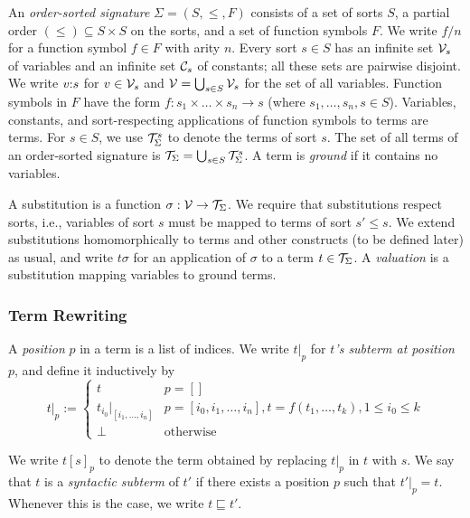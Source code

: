 An \emph{order-sorted signature} $\Sigma = (S, \leq, F)$ consists of a set of sorts $S$, a partial order $(\leq) \subseteq S \times S$ on the sorts, and a set of function symbols $F$.
We write $f/n$ for a function symbol $f \in F$ with arity $n$.
Every sort $s \in S$ has an infinite set $\mathcal{V}_s$ of variables and an infinite set $\mathcal{C}_s$ of constants; all these sets are pairwise disjoint.
We write $v{:}s$ for $v \in \mathcal{V}_s$ and $\mathcal{V} = \bigcup_{s \in S} \mathcal{V}_s$ for the set of all variables.
Function symbols in $F$ have the form $f: s_1 \times \dots \times s_n \rightarrow s$ (where $s_1, \dots, s_n, s \in S$).
Variables, constants, and sort-respecting applications of function symbols to terms are terms.
For $s \in S$, we use $\mathcal{T}_\Sigma^s$ to denote the terms of sort $s$.
The set of all terms of an order-sorted signature is $\mathcal{T}_\Sigma = \bigcup_{s \in S} \mathcal{T}_\Sigma^s$.
A term is \emph{ground} if it contains no variables.

A substitution is a function $\sigma: \mathcal{V} \to \mathcal{T}_\Sigma$.
We require that substitutions respect sorts, i.e., variables of sort $s$ must be mapped to terms of sort $s' \leq s$.
We extend substitutions homomorphically to terms and other constructs (to be defined later) as usual, and write $t\sigma$ for an application of $\sigma$ to a term $t \in \mathcal{T}_\Sigma$.
A \emph{valuation} is a substitution mapping variables to ground terms.

\subsubsection{Term Rewriting}

A \emph{position} $p$ in a term is a list of indices.
We write $t|_p$ for \emph{$t$'s subterm at position $p$}, and define it inductively by
\begin{equation*}
  t|_p := \begin{cases}
    t & p = [] \\
    t_{i_0}|_{[i_1, \dots, i_n]} & p = [i_0, i_1, \dots, i_n], t = f(t_1, \dots, t_k), 1 \leq i_0 \leq k \\
    \bot & \text{otherwise}
  \end{cases}
\end{equation*}

We write $t[s]_p$ to denote the term obtained by replacing $t|_p$ in $t$ with $s$.
We say that $t$ is a \emph{syntactic subterm} of $t'$ if there exists a position $p$ such that $t'|_p = t$.
Whenever this is the case, we write $t \sqsubseteq t'$.

